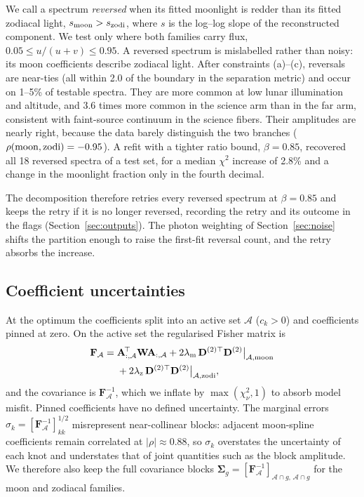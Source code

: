 We call a spectrum \emph{reversed} when its fitted moonlight is redder than
its fitted zodiacal light, $s_{\rm moon} > s_{\rm zodi}$, where $s$ is the
log--log slope of the reconstructed component. We test only where both
families carry flux, $0.05\le u/(u+v)\le0.95$. A reversed spectrum is
mislabelled rather than noisy: its moon coefficients describe zodiacal
light. After constraints (a)--(c), reversals are near-ties (all within 2.0
of the boundary in the separation metric) and occur on 1--5\% of testable
spectra. They are more common at low lunar illumination and altitude, and
3.6 times more common in the science arm than in the far arm, consistent
with faint-source continuum in the science fibers. Their amplitudes are
nearly right, because the data barely distinguish the two branches
($\rho({\rm moon},{\rm zodi}) = -0.95$). A refit with a tighter ratio bound,
$\beta = 0.85$, recovered all 18 reversed spectra of a test set, for a
median $\chi^2$ increase of 2.8\% and a change in the moonlight fraction only
in the fourth decimal.

The decomposition therefore retries every reversed spectrum at
$\beta = 0.85$ and keeps the retry if it is no longer reversed, recording
the retry and its outcome in the flags (Section~\ref{sec:outputs}). The
photon weighting of Section~\ref{sec:noise} shifts the partition enough to
raise the first-fit reversal count, and the retry absorbs the increase.

\subsection{Coefficient uncertainties}
\label{sec:uncertainties}

At the optimum the coefficients split into an active set $\mathcal{A}$
($c_k > 0$) and coefficients pinned at zero. On the active set the
regularised Fisher matrix is
\begin{equation}
\begin{split}
  \mathbf{F}_{\mathcal{A}} = {}&\mathbf{A}_{:,\mathcal{A}}^{\!\top}\mathbf{W}
  \mathbf{A}_{:,\mathcal{A}}
  + 2\lambda_{\rm m}\,\mathbf{D}^{(2)\top}\mathbf{D}^{(2)}\big|_{\mathcal{A},\rm moon}\\
  &+ 2\lambda_{\rm z}\,\mathbf{D}^{(2)\top}\mathbf{D}^{(2)}\big|_{\mathcal{A},\rm zodi},
\end{split}
\end{equation}
and the covariance is $\mathbf{F}_{\mathcal{A}}^{-1}$, which we inflate by
$\max(\chi^2_\nu,1)$ to absorb model misfit. Pinned coefficients have no
defined uncertainty. The marginal errors
$\sigma_k = [\mathbf{F}_{\mathcal{A}}^{-1}]_{kk}^{1/2}$ misrepresent
near-collinear blocks: adjacent moon-spline coefficients remain correlated at
$|\rho|\approx0.88$, so $\sigma_k$ overstates the uncertainty of each knot
and understates that of joint quantities such as the block amplitude. We
therefore also keep the full covariance blocks
$\mathbf{\Sigma}_g = [\mathbf{F}_{\mathcal{A}}^{-1}]_{\mathcal{A}\cap g,\,\mathcal{A}\cap g}$
for the moon and zodiacal families.

